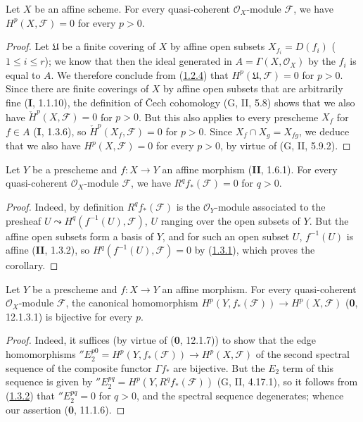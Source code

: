 \begin{theorem}[1.3.1]
\label{III.1.3.1}
Let $X$ be an affine scheme. For every quasi-coherent $\mathcal O_X$-module
$\mathcal F$, we have $H^p(X,\mathcal F)=0$ for every $p>0$.
\end{theorem}

\begin{proof}
Let $\mathfrak U$ be a finite covering of $X$ by affine open subsets
$X_{f_i}=D(f_i)$ ($1\leq i\leq r$); we know that then the ideal generated in
$A=\Gamma(X,\mathcal O_X)$ by the $f_i$ is equal to $A$. We therefore
conclude from (\hyperref[III.1.2.4]{1.2.4}) that
$H^p(\mathfrak U,\mathcal F)=0$ for $p>0$. Since there are finite
coverings of $X$ by affine open subsets that are arbitrarily fine
(\textbf{I}, 1.1.10), the definition of Čech cohomology (G, II, 5.8) shows that we
also have $\check H^p(X,\mathcal F)=0$ for $p>0$. But this also applies to
every prescheme $X_f$ for $f\in A$ (\textbf{I}, 1.3.6), so
$\check H^p(X_f,\mathcal F)=0$ for $p>0$. Since
$X_f\cap X_g=X_{fg}$, we deduce that we also have
$H^p(X,\mathcal F)=0$ for every $p>0$, by virtue of (G, II, 5.9.2).
\end{proof}

\begin{corollary}[1.3.2]
\label{III.1.3.2}
Let $Y$ be a prescheme and $f:X\to Y$ an affine morphism \textup{(\textbf{II}, 1.6.1)}. For
every quasi-coherent $\mathcal O_X$-module $\mathcal F$, we have
$R^qf_*(\mathcal F)=0$ for $q>0$.
\end{corollary}

\begin{proof}
Indeed, by definition $R^qf_*(\mathcal F)$ is the $\mathcal O_Y$-module
associated to the presheaf $U\leadsto H^q(f^{-1}(U),\mathcal F)$, $U$
ranging over the open subsets of $Y$. But the affine open subsets form a
basis of $Y$, and for such an open subset $U$, $f^{-1}(U)$ is affine
(\textbf{II}, 1.3.2), so $H^q(f^{-1}(U),\mathcal F)=0$ by
(\hyperref[III.1.3.1]{1.3.1}), which proves the corollary.
\end{proof}

\begin{corollary}[1.3.3]
\label{III.1.3.3}
Let $Y$ be a prescheme and $f:X\to Y$ an affine morphism. For every
quasi-coherent $\mathcal O_X$-module $\mathcal F$, the canonical homomorphism
$H^p(Y,f_*(\mathcal F))\to H^p(X,\mathcal F)$ \textup{(\textbf{0}, 12.1.3.1)} is bijective
for every $p$.
\end{corollary}

\begin{proof}
Indeed, it suffices (by virtue of (\textbf{0}, 12.1.7)) to show that the
edge homomorphisms
$''E_2^{p0}=H^p(Y,f_*(\mathcal F))\to H^p(X,\mathcal F)$ of the second
spectral sequence of the composite functor $\Gamma f_*$ are bijective. But
the $E_2$ term of this sequence is given by
$''E_2^{pq}=H^p(Y,R^qf_*(\mathcal F))$ (G, II, 4.17.1), so it follows from
(\hyperref[III.1.3.2]{1.3.2}) that $''E_2^{pq}=0$ for $q>0$, and the
spectral sequence degenerates; whence our assertion (\textbf{0}, 11.1.6).
\end{proof}

